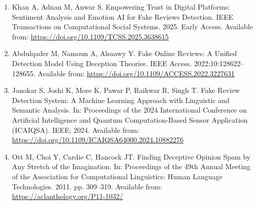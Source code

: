 \documentclass[12pt,a4paper]{report}
\begin{document}
\begin{enumerate}

    \item Khan A, Adnan M, Anwar S.
    Empowering Trust in Digital Platforms:
    Sentiment Analysis and Emotion AI for
    Fake Reviews Detection.
    IEEE Transactions on Computational Social Systems.
    2025. Early Access.
    Available from:
    \url{https://doi.org/10.1109/TCSS.2025.3638615}

    \item Abdulqader M, Namoun A, Alsaawy Y.
    Fake Online Reviews: A Unified Detection Model
    Using Deception Theories.
    IEEE Access. 2022;10:128622--128655.
    Available from:
    \url{https://doi.org/10.1109/ACCESS.2022.3227631}

    \item Janokar S, Joshi K, More K, Pawar P,
    Raikwar R, Singh T.
    Fake Review Detection System:
    A Machine Learning Approach with
    Linguistic and Semantic Analysis.
    In: Proceedings of the 2024 International
    Conference on Artificial Intelligence and
    Quantum Computation-Based Sensor Application
    (ICAIQSA). IEEE; 2024.
    Available from:
    \url{https://doi.org/10.1109/ICAIQSA64000.2024.10882276}

    \item Ott M, Choi Y, Cardie C, Hancock JT.
    Finding Deceptive Opinion Spam by Any
    Stretch of the Imagination.
    In: Proceedings of the 49th Annual Meeting
    of the Association for Computational Linguistics:
    Human Language Technologies. 2011.
    pp. 309--319.
    Available from:
    \url{https://aclanthology.org/P11-1032/}

\end{enumerate}
\end{document}
